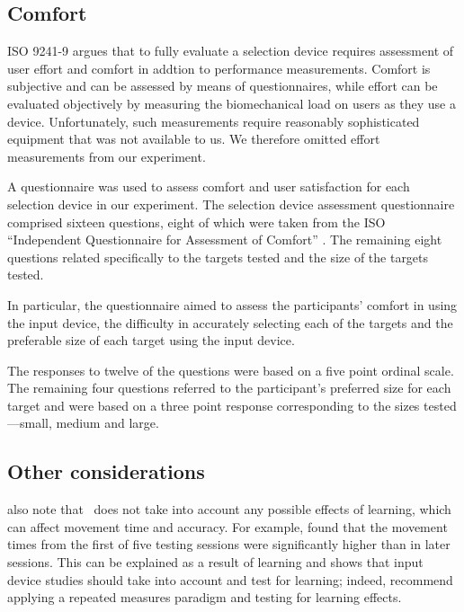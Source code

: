 \documentclass{elsart}
\begin{document}
\subsection{Comfort}
\label{sec-evaluation-comfort}

ISO 9241-9 argues that to fully evaluate a selection device requires
assessment of user effort and comfort in addtion to performance
measurements. Comfort is subjective and can be assessed by means of
questionnaires, while effort can be evaluated objectively by measuring
the biomechanical load on users as they use a device. Unfortunately,
such measurements require reasonably sophisticated equipment
\citep{Doug-SA-1999-CHI} that was not available to us. We therefore
omitted effort measurements from our experiment.

A questionnaire was used to assess comfort and user satisfaction for
each selection device in our experiment. The selection device assessment
questionnaire comprised sixteen questions, eight of which were taken
from the ISO ``Independent Questionnaire for Assessment of Comfort''
\citep{Doug-SA-1999-CHI}. The remaining eight questions related
specifically to the targets tested and the size of the targets tested.

In particular, the questionnaire aimed to assess the participants'
comfort in using the input device, the difficulty in accurately
selecting each of the targets and the preferable size of each target
using the input device.

The responses to twelve of the questions were based on a five point
ordinal scale. The remaining four questions referred to the
participant's preferred size for each target and were based on a three
point response corresponding to the sizes tested---small, medium and
large.


\subsection{Other considerations}
\label{sec-evaluation-other}

\citet{Doug-SA-1999-CHI} also note that \ISOnine\ does not take into
account any possible effects of learning, which can affect movement time
and accuracy. For example, \citet{Mack-IS-1991} found that the movement
times from the first of five testing sessions were significantly higher
than in later sessions. This can be explained as a result of learning
and shows that input device studies should take into account and test
for learning; indeed, \citet{Doug-SA-1999-CHI} recommend applying a
repeated measures paradigm and testing for learning effects.
\end{document}
